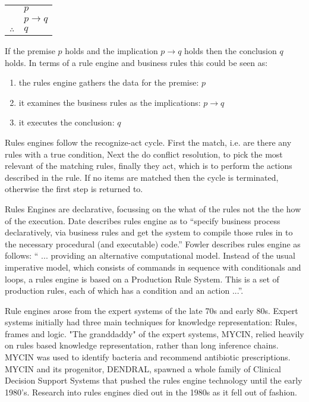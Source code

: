 \begin{tabular}{c@{\,}l@{}} 
    & $p$ \\
\arrayrulecolor{blue!60!green!70}    & $p \to q$ \\\cline{2-2}
$\therefore$         & $q$ \\
\end{tabular}

If the premise $p$ holds and the implication $p \to q$ holds then the conclusion $q$ holds.
In terms of a rule engine and business rules this could be seen as:
\begin{enumerate}
    \item the rules engine gathers the data for the premise: $p$
    \item it examines the business rules as the implications: $p \to q$
    \item it executes the conclusion: $q$
\end{enumerate}

Rules engines follow the recognize-act cycle.
First the match, i.e. are there any rules with a true condition, Next the do conflict resolution, to pick the most relevant of the matching rules, finally they act, which is to perform the actions described in the rule.
If no items are matched then the cycle is terminated, otherwise the first step is returned to.

Rules Engines are declarative, focussing on the what of the rules not the the how of the execution.
Date\cite{date2000not} describes rules engine as to ``specify business process declaratively, via business rules and get the system to compile those rules in to the necessary procedural (and executable) code.''
Fowler\cite{Fowler_rulesEngine} describes rules engine as follows: `` ... providing an alternative computational model.
Instead of the usual imperative model, which consists of commands in sequence with conditionals and loops, a rules engine is based on a Production Rule System.
This is a set of production rules, each of which has a condition and an action ...''.

Rule engines arose from the expert systems of the late 70s and early 80s.
Expert systems initially had three main techniques for knowledge representation: Rules, frames and logic\cite{jackson1986introduction}.
"The granddaddy" of the expert systems, MYCIN, relied heavily on rules based knowledge representation\cite{shortliffe1974mycin}, rather than long inference chains.
MYCIN was used to identify bacteria and recommend antibiotic prescriptions.
MYCIN and its progenitor, DENDRAL, spawned a whole family of Clinical Decision Support Systems that pushed the rules engine technology until the early 1980's.
Research into rules engines died out in the 1980s as it fell out of fashion.


